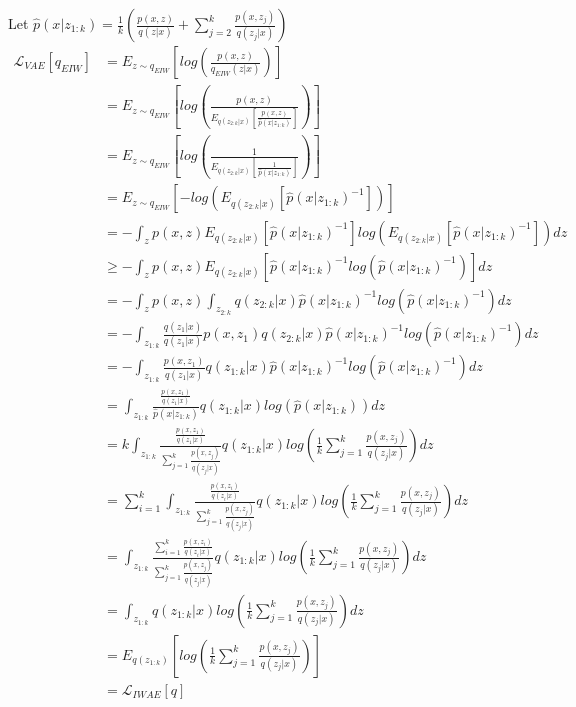 \documentclass{article} %
\begin{document}
Let $\hat{p}(x|z_{1:k})=\frac{1}{k} \left( \frac{p(x,z)}{q(z|x)}+ \sum_{j=2}^k \frac{p(x,z_j)}{q(z_j|x)} \right)$
\begin{align} 
    \mathcal{L}_{VAE}[q_{EIW}] &= E_{z \sim q_{EIW}} \left[ log \left( \frac{p(x,z)}{q_{EIW}(z|x)} \right) \right] \\
    &= E_{z \sim q_{EIW}} \left[ log \left( \frac{p(x,z)}{E_{q(z_{2:k} |x)} \left[ \frac{p(x,z)}{ \hat{p}(x|z_{1:k})} \right]}  \right) \right] \\
    &= E_{z \sim q_{EIW}} \left[ log \left( \frac{1}{E_{q(z_{2:k} |x)} \left[ \frac{1}{ \hat{p}(x|z_{1:k}) } \right]}  \right) \right] \\
    &= E_{z \sim q_{EIW}} \left[ - log \left( E_{q(z_{2:k} |x)} \left[  \hat{p}(x|z_{1:k})^{-1} \right] \right) \right] \\   
    &= - \int_{z} p(x,z) E_{q(z_{2:k} |x)} \left[  \hat{p}(x|z_{1:k})^{-1} \right] log \left( E_{q(z_{2:k} |x)} \left[  \hat{p}(x|z_{1:k})^{-1} \right] \right) dz \\  
    &\geq - \int_{z} p(x,z) E_{q(z_{2:k} |x)} \left[  \hat{p}(x|z_{1:k})^{-1} log \left(  \hat{p}(x|z_{1:k})^{-1} \right) \right]  dz \label{geq} \\   
    &= - \int_{z} p(x,z) \int_{z_{2:k}} q(z_{2:k} |x) \hat{p}(x|z_{1:k})^{-1} log \left(  \hat{p}(x|z_{1:k})^{-1} \right)  dz \\  
    &= - \int_{z_{1:k}}  \frac{q(z_1|x)}{q(z_1|x)} p(x,z_1)  q(z_{2:k} |x)  \hat{p}(x|z_{1:k})^{-1} log \left(  \hat{p}(x|z_{1:k})^{-1} \right)   dz \label{z1} \\ 
    &= - \int_{z_{1:k}}  \frac{p(x,z_1)}{q(z_1|x)}   q(z_{1:k} |x)  \hat{p}(x|z_{1:k})^{-1} log \left(  \hat{p}(x|z_{1:k})^{-1} \right)   dz \\ 
    &= \int_{z_{1:k}}  \frac{\frac{p(x,z_1)}{q(z_1|x)}}{\hat{p}(x|z_{1:k})}     q(z_{1:k} |x)  log \left(  \hat{p}(x|z_{1:k}) \right)   dz \\ 
    &= k \int_{z_{1:k}}  \frac{\frac{p(x,z_1)}{q(z_1|x)}}{ \sum_{j=1}^k \frac{p(x,z_j)}{q(z_j|x)} }     q(z_{1:k} |x)  log \left(  \frac{1}{k} \sum_{j=1}^k \frac{p(x,z_j)}{q(z_j|x)} \right)   dz \\ 
    &= \sum_{i=1}^{k} \int_{z_{1:k}}  \frac{\frac{p(x,z_i)}{q(z_i|x)}}{ \sum_{j=1}^k \frac{p(x,z_j)}{q(z_j|x)} }     q(z_{1:k} |x)  log \left(  \frac{1}{k} \sum_{j=1}^k \frac{p(x,z_j)}{q(z_j|x)} \right)   dz \label{sum} \\ 
    &=  \int_{z_{1:k}}  \frac{ \sum_{i=1}^{k} \frac{p(x,z_i)}{q(z_i|x)}}{ \sum_{j=1}^k \frac{p(x,z_j)}{q(z_j|x)} }     q(z_{1:k} |x)  log \left(  \frac{1}{k} \sum_{j=1}^k \frac{p(x,z_j)}{q(z_j|x)} \right)   dz \\
    &=  \int_{z_{1:k}} q(z_{1:k} |x)  log \left(  \frac{1}{k} \sum_{j=1}^k \frac{p(x,z_j)}{q(z_j|x)} \right)   dz \\
    &= E_{q(z_{1:k})} \left[ log \left(  \frac{1}{k} \sum_{j=1}^k \frac{p(x,z_j)}{q(z_j|x)} \right)  \right] \\
    &= \mathcal{L}_{IWAE}[q] 
\end{align}
\end{document}
